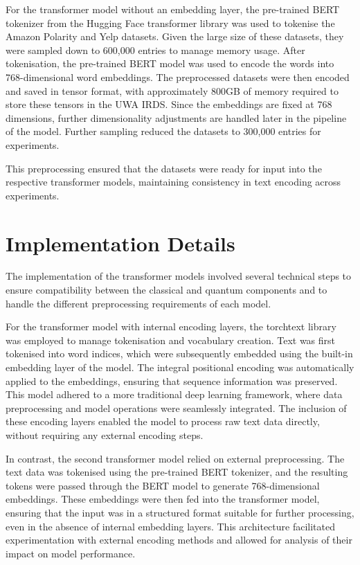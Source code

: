 For the transformer model without an embedding layer, the pre-trained
\gls{BERT} tokenizer from the Hugging Face transformer library was used to
tokenise the Amazon Polarity and Yelp datasets. Given the large size
of these datasets, they were sampled down to 600,000 entries to
manage memory usage. After tokenisation, the pre-trained \gls{BERT} model
was used to encode the words into 768-dimensional word embeddings.
The preprocessed datasets were then encoded and saved in tensor
format, with approximately 800GB of memory required to store these
tensors in the \acrshort{UWA} \gls{IRDS}. Since
the embeddings are fixed at 768 dimensions, further dimensionality
adjustments are handled later in the pipeline of the model. Further
sampling reduced the datasets to 300,000 entries for experiments.

This preprocessing ensured that the datasets were ready for input
into the respective transformer models, maintaining consistency in
text encoding across experiments.

\section{Implementation Details}
\label{sec:implementation_details}
The implementation of the transformer models involved several
technical steps to ensure compatibility between the classical and
quantum components and to handle the different preprocessing
requirements of each model.

For the transformer model with internal encoding layers, the
torchtext library was employed to manage tokenisation and vocabulary
creation. Text was first tokenised into word indices, which were
subsequently embedded using the built-in embedding layer of the model. The
integral positional encoding was automatically applied to the
embeddings, ensuring that sequence information was preserved. This
model adhered to a more traditional deep learning framework, where
data preprocessing and model operations were seamlessly integrated.
The inclusion of these encoding layers enabled the model to process
raw text data directly, without requiring any external encoding steps.

In contrast, the second transformer model relied on external
preprocessing. The text data was tokenised using the pre-trained \gls{BERT}
tokenizer, and the resulting tokens were passed through the \gls{BERT}
model to generate 768-dimensional embeddings. These embeddings were
then fed into the transformer model, ensuring that the input was in a
structured format suitable for further processing, even in the
absence of internal embedding layers. This architecture facilitated
experimentation with external encoding methods and allowed for
analysis of their impact on model performance.

